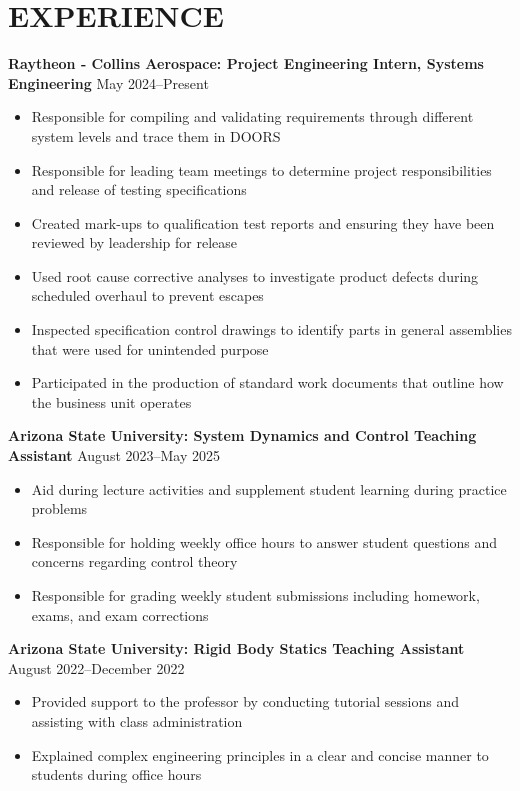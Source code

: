 \documentclass{article}
\begin{document}
	\section{EXPERIENCE}
	\textbf{Raytheon - Collins Aerospace: Project Engineering Intern, Systems Engineering}
	\hfill
	\vspace{0.5em}
	May 2024--Present
	\begin{itemize}
		\item{ Responsible for compiling and validating requirements through different system levels and trace them in DOORS}
		\item{ Responsible for leading team meetings to determine project responsibilities and release of testing specifications}
		\item{ Created mark-ups to qualification test reports and ensuring they have been reviewed by leadership for release}
		\item{ Used root cause corrective analyses to investigate product defects during scheduled overhaul to prevent escapes}
		\item{ Inspected specification control drawings to identify parts in general assemblies that were used for unintended purpose}
		\item{ Participated in the production of standard work documents that outline how the business unit operates}
	\end{itemize}
	\vspace{1em}
	\textbf{Arizona State University: System Dynamics and Control Teaching Assistant}
	\hfill
	\vspace{0.5em}
	August 2023--May 2025
	\begin{itemize}
		\item{ Aid during lecture activities and supplement student learning during practice problems}
		\item{ Responsible for holding weekly office hours to answer student questions and concerns regarding control theory}
		\item{ Responsible for grading weekly student submissions including homework, exams, and exam corrections}
	\end{itemize}
	\vspace{1em}
	\textbf{Arizona State University: Rigid Body Statics Teaching Assistant}
	\hfill
	\vspace{0.5em}
	August 2022--December 2022
	\begin{itemize}
		\item{ Provided support to the professor by conducting tutorial sessions and assisting with class administration}
		\item{ Explained complex engineering principles in a clear and concise manner to students during office hours}
	\end{itemize}
	
\end{document}

